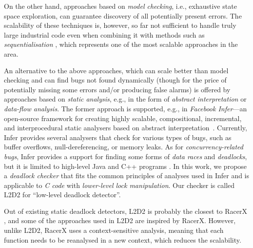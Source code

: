 \documentclass[runningheads]{llncs}
\begin{document}
On the other hand, approaches based on \emph{model checking}, i.e., exhaustive
state space exploration, can guarantee discovery of all potentially present
errors.
%
%
The scalability of these techniques is, however, so far not sufficient to handle
truly large industrial code even when combining it with methods such as
\emph{sequentialisation} \cite{lazy-seq-16}, 
%
%
which represents one of the most scalable approaches in the area.

An alternative to the above approaches, which can scale better than model
checking and can find bugs not found dynamically (though for the price of
potentially missing some errors and/or producing false alarms) is offered by
approaches based on \emph{static analysis}, e.g., in the form of \emph{abstract
interpretation} or \emph{data-flow analysis}.
%
The former approach is supported, e.g., in \emph{Facebook Infer}---an
open-source framework for creating highly scalable, compositional, incremental,
and interprocedural static analysers based on abstract
interpretation~\cite{inferNFM15}.
%
%
%
Currently, Infer provides several analysers that check for various types of
bugs, such as buffer overflows, null-dereferencing, or memory leaks.
%
%
As for \emph{concurrency-related bugs}, Infer provides a support for finding
some forms of \emph{data races} and \emph{deadlocks}, but it is limited to
high-level Java and C++ programs \cite{racerD18,inferCACM19}.
%
In this work, we propose a \emph{deadlock checker} that fits the common
principles of analyses used in Infer and is applicable to \emph{C code} with
\emph{lower-level lock manipulation}.
%
Our checker is called L2D2 for ``low-level deadlock detector''.

\enlargethispage{6mm}

Out of existing static deadlock detectors, L2D2 is probably the closest to
RacerX \cite{racerX03}, and some of the approaches used in L2D2 are inspired by
RacerX.
%
However, unlike L2D2, RacerX uses a context-sensitive analysis, meaning that
each function needs to be reanalysed in a new context, which reduces the
scalability.
\end{document}
